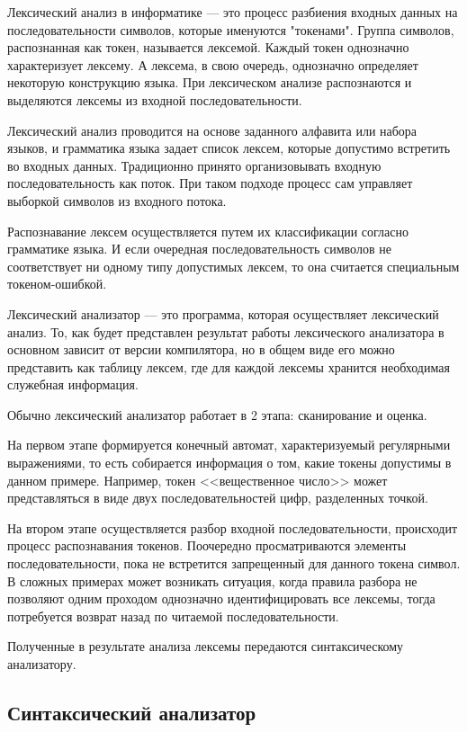 \documentclass[bachelor, och, coursework, times]{SCWorks}
\begin{document}
Лексический анализ в информатике --- это процесс разбиения входных данных на последовательности символов, которые именуются "токенами". Группа символов, распознанная как токен, называется лексемой. Каждый токен однозначно характеризует лексему. А лексема, в свою очередь, однозначно определяет некоторую конструкцию языка. При лексическом анализе распознаются и выделяются лексемы из входной последовательности.

Лексический анализ проводится на основе заданного алфавита или набора языков, и грамматика языка задает список лексем, которые допустимо встретить во входных данных.
Традиционно принято организовывать входную последовательность как поток. При таком подходе процесс сам управляет выборкой символов из входного потока.

Распознавание лексем осуществляется путем их классификации согласно грамматике языка. 
И если очередная последовательность символов не соответствует ни одному типу допустимых лексем, то она считается специальным токеном-ошибкой.

Лексический анализатор --- это программа, которая осуществляет лексический анализ.
То, как будет представлен результат работы лексического анализатора в основном зависит от версии компилятора, но в общем виде его можно представить как таблицу лексем, где для каждой лексемы хранится необходимая служебная информация.

Обычно лексический анализатор работает в 2 этапа: сканирование и оценка.

На первом этапе формируется конечный автомат, характеризуемый регулярными выражениями, то есть собирается информация о том, какие токены допустимы в данном примере. Например, токен <<вещественное число>> может представляться в виде двух последовательностей цифр, разделенных точкой.

На втором этапе осуществляется разбор входной последовательности, происходит процесс распознавания токенов. Поочередно просматриваются элементы последовательности, пока не встретится запрещенный для данного токена символ. В сложных примерах может возникать ситуация, когда правила разбора не позволяют одним проходом однозначно идентифицировать все лексемы, тогда потребуется возврат назад по читаемой последовательности.

Полученные в результате анализа лексемы передаются синтаксическому анализатору.~\cite{Compilers}

\subsection{Синтаксический анализатор}
\end{document}
